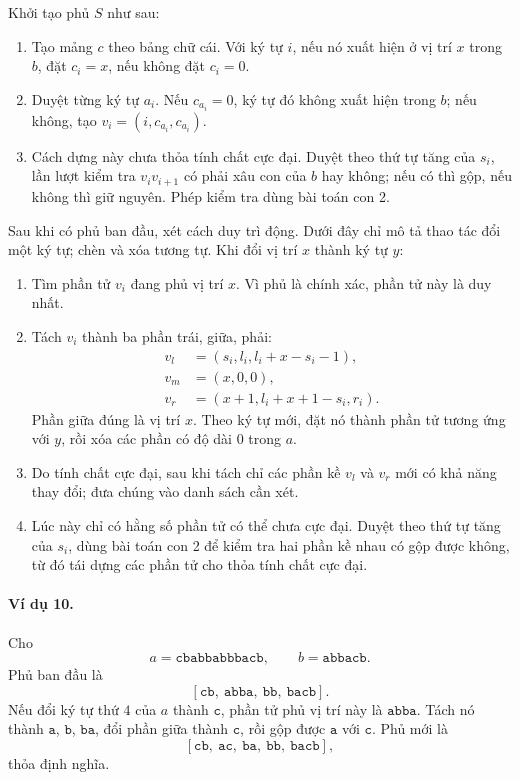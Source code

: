 \documentclass[11pt]{article}
\begin{document}
Khởi tạo phủ \(S\) như sau:
\begin{enumerate}
  \item Tạo mảng \(c\) theo bảng chữ cái. Với ký tự \(i\), nếu nó xuất hiện ở vị
  trí \(x\) trong \(b\), đặt \(c_i=x\), nếu không đặt \(c_i=0\).
  \item Duyệt từng ký tự \(a_i\). Nếu \(c_{a_i}=0\), ký tự đó không xuất hiện
  trong \(b\); nếu không, tạo \(v_i=(i,c_{a_i},c_{a_i})\).
  \item Cách dựng này chưa thỏa tính chất cực đại. Duyệt theo thứ tự tăng của
  \(s_i\), lần lượt kiểm tra \(v_iv_{i+1}\) có phải xâu con của \(b\) hay không;
  nếu có thì gộp, nếu không thì giữ nguyên. Phép kiểm tra dùng bài toán con 2.
\end{enumerate}

Sau khi có phủ ban đầu, xét cách duy trì động. Dưới đây chỉ mô tả thao tác đổi
một ký tự; chèn và xóa tương tự. Khi đổi vị trí \(x\) thành ký tự \(y\):
\begin{enumerate}
  \item Tìm phần tử \(v_i\) đang phủ vị trí \(x\). Vì phủ là chính xác, phần tử
  này là duy nhất.
  \item Tách \(v_i\) thành ba phần trái, giữa, phải:
  \[
  \begin{aligned}
    v_l&=(s_i,l_i,l_i+x-s_i-1),\\
    v_m&=(x,0,0),\\
    v_r&=(x+1,l_i+x+1-s_i,r_i).
  \end{aligned}
  \]
  Phần giữa đúng là vị trí \(x\). Theo ký tự mới, đặt nó thành phần tử tương
  ứng với \(y\), rồi xóa các phần có độ dài \(0\) trong \(a\).
  \item Do tính chất cực đại, sau khi tách chỉ các phần kề \(v_l\) và \(v_r\)
  mới có khả năng thay đổi; đưa chúng vào danh sách cần xét.
  \item Lúc này chỉ có hằng số phần tử có thể chưa cực đại. Duyệt theo thứ tự
  tăng của \(s_i\), dùng bài toán con 2 để kiểm tra hai phần kề nhau có gộp được
  không, từ đó tái dựng các phần tử cho thỏa tính chất cực đại.
\end{enumerate}

\paragraph{Ví dụ 10.}
Cho
\[
  a=\texttt{cbabbabbbacb},\qquad b=\texttt{abbacb}.
\]
Phủ ban đầu là
\[
  [\texttt{cb},\ \texttt{abba},\ \texttt{bb},\ \texttt{bacb}].
\]
Nếu đổi ký tự thứ \(4\) của \(a\) thành \(\texttt{c}\), phần tử phủ vị trí này
là \(\texttt{abba}\). Tách nó thành \(\texttt{a}\), \(\texttt{b}\),
\(\texttt{ba}\), đổi phần giữa thành \(\texttt{c}\), rồi gộp được
\(\texttt{a}\) với \(\texttt{c}\). Phủ mới là
\[
  [\texttt{cb},\ \texttt{ac},\ \texttt{ba},\ \texttt{bb},\ \texttt{bacb}],
\]
thỏa định nghĩa.
\end{document}
